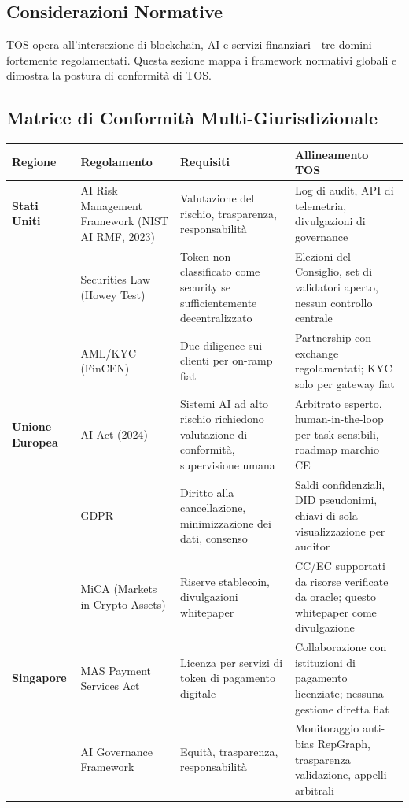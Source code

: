 \documentclass[11pt]{article}
\begin{document}
\begin{itemize}[noitemsep]
\section{Considerazioni Normative}
\label{sec:regulatory}

TOS opera all'intersezione di blockchain, AI e servizi finanziari—tre domini fortemente regolamentati. Questa sezione mappa i framework normativi globali e dimostra la postura di conformità di TOS.

\subsection{Matrice di Conformità Multi-Giurisdizionale}

\begin{longtable}{@{}p{}p{}p{}p{}@{}}
\toprule
\textbf{Regione} & \textbf{Regolamento} & \textbf{Requisiti} & \textbf{Allineamento TOS} \\\midrule
\textbf{Stati Uniti} & AI Risk Management Framework (NIST AI RMF, 2023) & Valutazione del rischio, trasparenza, responsabilità & Log di audit, API di telemetria, divulgazioni di governance \\
 & Securities Law (Howey Test) & Token non classificato come security se sufficientemente decentralizzato & Elezioni del Consiglio, set di validatori aperto, nessun controllo centrale \\
 & AML/KYC (FinCEN) & Due diligence sui clienti per on-ramp fiat & Partnership con exchange regolamentati; KYC solo per gateway fiat \\
\textbf{Unione Europea} & AI Act (2024) & Sistemi AI ad alto rischio richiedono valutazione di conformità, supervisione umana & Arbitrato esperto, human-in-the-loop per task sensibili, roadmap marchio CE \\
 & GDPR & Diritto alla cancellazione, minimizzazione dei dati, consenso & Saldi confidenziali, DID pseudonimi, chiavi di sola visualizzazione per auditor \\
 & MiCA (Markets in Crypto-Assets) & Riserve stablecoin, divulgazioni whitepaper & CC/EC supportati da risorse verificate da oracle; questo whitepaper come divulgazione \\
\textbf{Singapore} & MAS Payment Services Act & Licenza per servizi di token di pagamento digitale & Collaborazione con istituzioni di pagamento licenziate; nessuna gestione diretta fiat \\
 & AI Governance Framework & Equità, trasparenza, responsabilità & Monitoraggio anti-bias RepGraph, trasparenza validazione, appelli arbitrali \\

\end{longtable}
\end{itemize}
\end{document}
